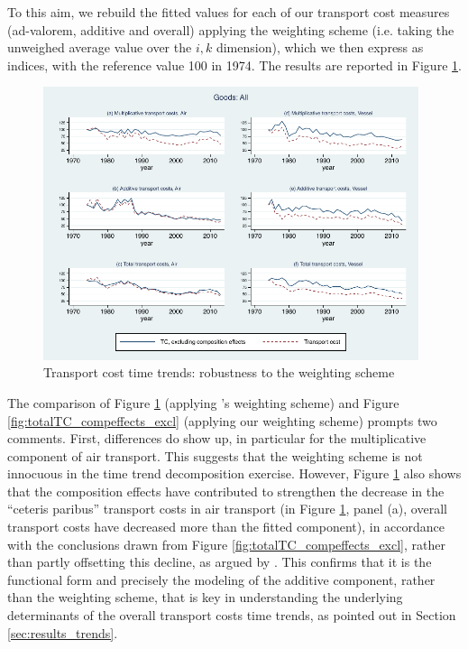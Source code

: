\documentclass[a4paper,11pt]{article}
\begin{document}
To this aim, we rebuild the fitted values for each of our transport cost measures (ad-valorem, additive and overall) applying the \cite{hummels2007} weighting scheme (i.e. taking the unweighed average value over the $i,k$ dimension), which we then express as indices, with the reference value 100 in 1974.
The results are reported in Figure \ref{fig:compeffects_robustness}.

\begin{figure}[htbp]
\caption{Transport cost time trends: robustness to the weighting scheme}
\label{fig:compeffects_robustness}
\begin{center}
\includegraphics[height=8cm]
{graph_composition_all_np.pdf}
\end{center}
\end{figure}

The comparison of Figure \ref{fig:compeffects_robustness} (applying \citealp{hummels2007}'s weighting scheme) and Figure \ref{fig:totalTC_compeffects_excl} (applying our weighting scheme) prompts two comments.
First, differences do show up, in particular for the multiplicative component of air transport.
This suggests that the weighting scheme is not innocuous in the time trend decomposition exercise.
However, Figure \ref{fig:compeffects_robustness} also shows that the composition effects have contributed to strengthen the decrease in the ``ceteris paribus'' transport costs in air transport (in Figure \ref{fig:compeffects_robustness}, panel (a), overall transport costs have decreased more than the fitted component), in accordance with the conclusions drawn from Figure \ref{fig:totalTC_compeffects_excl}, rather than partly offsetting this decline, as argued by \cite{hummels2007}.
This confirms that it is the functional form and precisely the modeling of the additive component, rather than the weighting scheme, that is key in understanding the underlying determinants of the overall transport costs time trends, as pointed out in Section \ref{sec:results_trends}.
\end{document}
